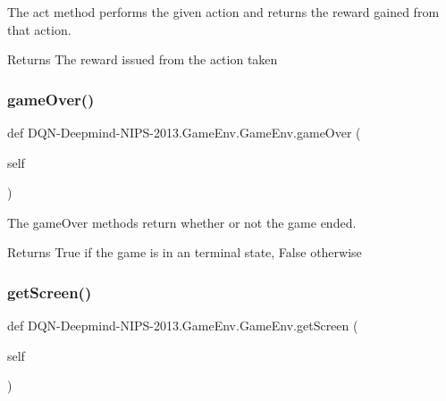 The act method performs the given action and returns the reward gained from that action. 

\begin{DoxyReturn}{Returns}
The reward issued from the action taken 
\end{DoxyReturn}
\hypertarget{classDQN-Deepmind-NIPS-2013_1_1GameEnv_1_1GameEnv_a1ccc35e029e05910c3c25ffa602e442b}{}\label{classDQN-Deepmind-NIPS-2013_1_1GameEnv_1_1GameEnv_a1ccc35e029e05910c3c25ffa602e442b} 
\subsubsection{\texorpdfstring{game\+Over()}{gameOver()}}
{\footnotesize\ttfamily def D\+QN-\/Deepmind-\/N\+I\+PS-\/2013.Game\+Env.\+Game\+Env.\+game\+Over (\begin{DoxyParamCaption}\item[{}]{self }\end{DoxyParamCaption})}



The game\+Over methods return whether or not the game ended. 

\begin{DoxyReturn}{Returns}
True if the game is in an terminal state, False otherwise 
\end{DoxyReturn}
\hypertarget{classDQN-Deepmind-NIPS-2013_1_1GameEnv_1_1GameEnv_a37712548267b91afddb6866fddf22b94}{}\label{classDQN-Deepmind-NIPS-2013_1_1GameEnv_1_1GameEnv_a37712548267b91afddb6866fddf22b94} 
\subsubsection{\texorpdfstring{get\+Screen()}{getScreen()}}
{\footnotesize\ttfamily def D\+QN-\/Deepmind-\/N\+I\+PS-\/2013.Game\+Env.\+Game\+Env.\+get\+Screen (\begin{DoxyParamCaption}\item[{}]{self }\end{DoxyParamCaption})}



